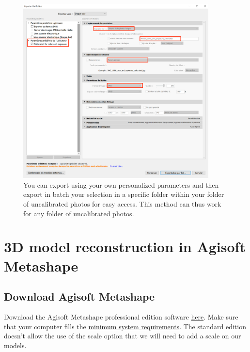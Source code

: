 \documentclass[
]{book}
\theoremstyle{definition}
\theoremstyle{definition}
\theoremstyle{definition}
\theoremstyle{definition}
\theoremstyle{remark}
\begin{document}
\begin{figure}
\hypertarget{export_parameters}{%
\centering
\includegraphics[width=0.9\textwidth,height=\textheight]{Figures/export_capture_1.png}
\caption{You can export using your own personalized parameters and then export
in batch your selection in a specific folder within your folder of
uncalibrated photos for easy access. This method can thus work for any
folder of uncalibrated
photos.}\label{export_parameters}
}
\end{figure}

\hypertarget{d-model-reconstruction-in-agisoft-metashape}{%
\chapter{3D model reconstruction in Agisoft Metashape}\label{d-model-reconstruction-in-agisoft-metashape}}

\hypertarget{download-agisoft-metashape}{%
\section{Download Agisoft Metashape}\label{download-agisoft-metashape}}

Download the Agisoft Metashape professional edition software
\href{https://www.agisoft.com/downloads/installer/}{here}. Make sure that
your computer fills the \href{https://www.agisoft.com/downloads/system-requirements/}{minimum system
requirements}.
The standard edition doesn't allow the use of the scale option that we
will need to add a scale on our models.
\end{document}
